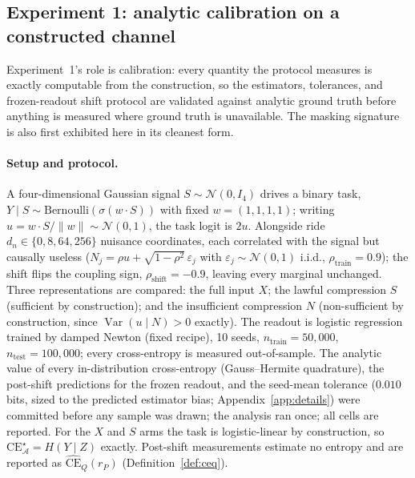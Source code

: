 \documentclass[twocolumn,10pt]{article}
\theoremstyle{definition}
\theoremstyle{remark}
\newcommand{\cA}{\mathcal{A}}
\newcommand{\dn}{d_n}
\newcommand{\CE}{\mathrm{CE}}
\newcommand{\rP}{r_{P}}
\newcommand{\CEhat}{\widehat{\CE}}
\begin{document}
\subsection{Experiment 1: analytic calibration on a constructed
channel}
\label{sec:exp1}

Experiment~1's role is calibration: every quantity the protocol
measures is exactly computable from the construction, so the
estimators, tolerances, and frozen-readout shift protocol are
validated against analytic ground truth before anything is measured
where ground truth is unavailable. The masking signature is also
first exhibited here in its cleanest form.

\paragraph{Setup and protocol.} A four-dimensional Gaussian signal
$S \sim \mathcal N(0, I_4)$ drives a binary task,
$Y \mid S \sim \mathrm{Bernoulli}(\sigma(w \cdot S))$ with fixed
$w = (1,1,1,1)$; writing $u = w \cdot S / \|w\| \sim \mathcal N(0,1)$,
the task logit is $2u$. Alongside ride $\dn \in \{0, 8, 64, 256\}$
nuisance coordinates, each correlated with the signal but causally
useless ($N_j = \rho u + \sqrt{1 - \rho^2}\, \varepsilon_j$ with
$\varepsilon_j \sim \mathcal N(0,1)$ i.i.d.,
$\rho_{\mathrm{train}} = 0.9$); the shift flips the coupling sign,
$\rho_{\mathrm{shift}} = -0.9$, leaving every marginal unchanged.
Three representations are compared: the full input $X$; the lawful
compression $S$ (sufficient by construction); and the insufficient
compression $N$ (non-sufficient by construction, since
$\operatorname{Var}(u \mid N) > 0$ exactly). The readout is logistic
regression trained by damped Newton (fixed recipe), 10 seeds,
$n_{\mathrm{train}} = 50{,}000$, $n_{\mathrm{test}} = 100{,}000$;
every cross-entropy is measured out-of-sample. The analytic value of
every in-distribution cross-entropy (Gauss--Hermite quadrature), the
post-shift predictions for the frozen readout, and the seed-mean
tolerance ($0.010$ bits, sized to the predicted estimator bias;
Appendix~\ref{app:details}) were committed before any sample was
drawn; the analysis ran once; all cells are reported. For the $X$ and
$S$ arms the task is logistic-linear by construction, so
$\CE^{\star}_{\cA} = H(Y \mid Z)$ exactly. Post-shift measurements
estimate no entropy and are reported as $\CEhat_Q(\rP)$
(Definition~\ref{def:ceq}).
\end{document}
